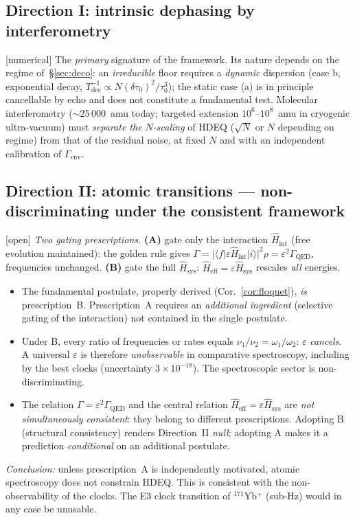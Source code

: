 \documentclass[11pt,a4paper]{article}
\newcommand{\Hsysop}{\hat{H}_{\mathrm{sys}}}
\newcommand{\Heff}{\hat{H}_{\mathrm{eff}}}
\newcommand{\statut}[1]{{\footnotesize\textsf{[#1]}}}
\theoremstyle{plain}
\theoremstyle{definition}
\theoremstyle{remark}
\begin{document}
\subsection{Direction I: intrinsic dephasing by interferometry}
\statut{numerical} The \emph{primary} signature of the framework. Its nature
depends on the regime of~\S\ref{sec:deco}: an \emph{irreducible} floor requires a
\emph{dynamic} dispersion (case b, exponential decay, $T_{\mathrm{dec}}^{-1}\propto
N(\delta\tau_0)^2/\tau_0^3$); the static case (a) is in principle cancellable by
echo and does not constitute a fundamental test. Molecular interferometry
($\sim$25\,000~amu today; targeted extension $10^6$--$10^8$~amu in cryogenic
ultra-vacuum) must \emph{separate the $N$-scaling} of HDEQ ($\sqrt N$ or $N$
depending on regime) from that of the residual noise, at fixed $N$ and with an
independent calibration of $\Gamma_{\mathrm{env}}$.

\subsection{Direction II: atomic transitions --- non-discriminating under the consistent framework}
\statut{open} \emph{Two gating prescriptions.} \textbf{(A)} gate only the
interaction $\hat H_{\mathrm{int}}$ (free evolution maintained): the golden rule
gives $\Gamma=|\langle f|\varepsilon\hat H_{\mathrm{int}}|i\rangle|^2\rho
=\varepsilon^2\Gamma_{\mathrm{QED}}$, frequencies unchanged. \textbf{(B)} gate the
full $\Hsysop$: $\Heff=\varepsilon\Hsysop$ rescales \emph{all} energies.
\begin{itemize}
\item The fundamental postulate, properly derived (Cor.~\ref{cor:floquet}),
\emph{is} prescription~B. Prescription~A requires an \emph{additional ingredient}
(selective gating of the interaction) not contained in the single postulate.
\item Under B, every ratio of frequencies or rates equals $\nu_1/\nu_2=\omega_1/\omega_2$:
$\varepsilon$ \emph{cancels}. A universal $\varepsilon$ is therefore
\emph{unobservable} in comparative spectroscopy, including by the best clocks
(uncertainty $3\times10^{-18}$). The spectroscopic sector is non-discriminating.
\item The relation $\Gamma=\varepsilon^2\Gamma_{\mathrm{QED}}$ and the central
relation $\Heff=\varepsilon\Hsysop$ are \emph{not simultaneously consistent}: they
belong to different prescriptions. Adopting B (structural consistency) renders
Direction~II \emph{null}; adopting A makes it a prediction \emph{conditional} on
an additional postulate.
\end{itemize}
\emph{Conclusion:} unless prescription~A is independently motivated, atomic
spectroscopy does not constrain HDEQ. This is consistent with the
non-observability of the clocks. The E3 clock transition of $^{171}$Yb$^+$
(sub-Hz) would in any case be unusable.
\end{document}
